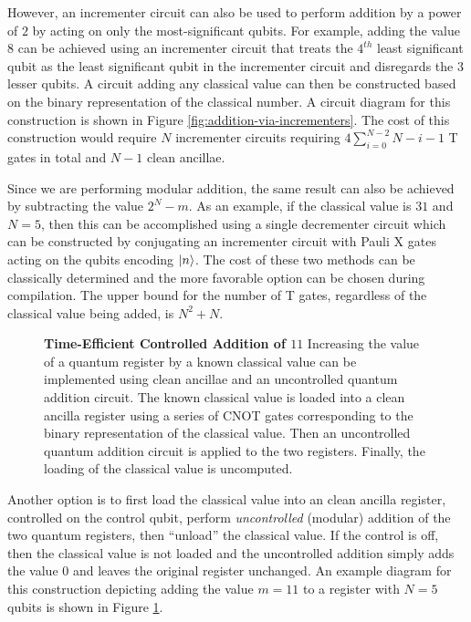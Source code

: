 However, an incrementer circuit can also be used to perform addition by a power of $2$ by acting on only the most-significant qubits.
For example, adding the value $8$ can be achieved using an incrementer circuit that treats the $4^{th}$ least significant qubit as the least significant qubit in the incrementer circuit and disregards the $3$ lesser qubits.
A circuit adding any classical value can then be constructed based on the binary representation of the classical number.
A circuit diagram for this construction is shown in Figure \ref{fig:addition-via-incrementers}.
The cost of this construction would require $N$ incrementer circuits requiring $4 \sum_{i=0}^{N - 2} N - i - 1$ T gates in total and $N - 1$ clean ancillae.

Since we are performing modular addition, the same result can also be achieved by subtracting the value $2^N - m$.
As an example, if the classical value is $31$ and $N = 5$, then this can be accomplished using a single decrementer circuit which can be constructed by conjugating an incrementer circuit with Pauli X gates acting on the qubits encoding $\ket{n}$.
The cost of these two methods can be classically determined and the more favorable option can be chosen during compilation.
The upper bound for the number of T gates, regardless of the classical value being added, is $N^2 + N$.


\begin{figure}
    
    \caption{
        \textbf{Time-Efficient Controlled Addition of $11$}
        Increasing the value of a quantum register by a known classical value can be implemented using clean ancillae and an uncontrolled quantum addition circuit.
        The known classical value is loaded into a clean ancilla register using a series of CNOT gates corresponding to the binary representation of the classical value.
        Then an uncontrolled quantum addition circuit is applied to the two registers.
        Finally, the loading of the classical value is uncomputed.
    }
    \label{fig:addition-gate-efficient}
\end{figure}

Another option is to first load the classical value into an clean ancilla register, controlled on the control qubit, perform \textit{uncontrolled} (modular) addition of the two quantum registers, then ``unload'' the classical value.
If the control is off, then the classical value is not loaded and the uncontrolled addition simply adds the value $0$ and leaves the original register unchanged.
An example diagram for this construction depicting adding the value $m = 11$ to a register with $N = 5$ qubits is shown in Figure \ref{fig:addition-gate-efficient}.

